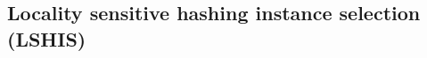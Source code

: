\begin{comment}
Podemos clasificar estos algoritmos de acuerdo al tipo de instancias que eliminemos ~\cite{Garcia2012}. Así pues, podemos distinguir entre:

\begin{itemize}
	\item \textbf{Algoritmos de condensación:} Se concentra en mantener las instancias cercanas a las fronteras de decisión entre las clases.
	\item \textbf{Algoritmos de edición:} Eliminan instancias ruidosas así como aquellas que se encuentran muy cerca de la frontera de decisión, intentando mejorar la calidad del conjunto y produciendo una frontera entre clases mucho más suave.
	\item \textbf{Algoritmos híbridos:} Intentan encontrar el subconjunto de instancias más pequeño posible que mantenga o incluso mejore el resultado que más tarde conseguirá el algoritmo de minería de datos que apliquemos. Para ello permite eliminar cualquier tipo de instancias. 
\end{itemize}

De la misma manera, según la forma en la que se construya el nuevo conjunto de datos podemos diferenciar entre las siguientes clases de algoritmos~\cite{Garcia2011}:

\begin{itemize}
	\item \textbf{De incremento:} Partimos de un conjunto vacío o con unas pocas instancias significativas y añadimos nuevas instancias con cada iteración del algoritmo.
	\item \textbf{De decremento:} Comenzamos con todas las instancias y mediante operaciones de eliminación conseguimos un nuevo conjunto de tamaño menor.
	\item \textbf{Fijos:} Desde el principio el usuario indica el número final de instancias al que queremos reducir un conjunto. Son algoritmos muy dependientes del conjunto de datos utilizado. 
	\item \textbf{Mixto:} Comenzamos con un subconjunto de instancias, obtenidas de manera aleatoria o tras aplicar otro algoritmo de selección, y realizamos operaciones para añadir o eliminar instancias de ese dicho conjunto.
\end{itemize}

\end{comment}

\subsection{Locality sensitive hashing instance selection (LSHIS)}\label{sec:defLSHIS}

